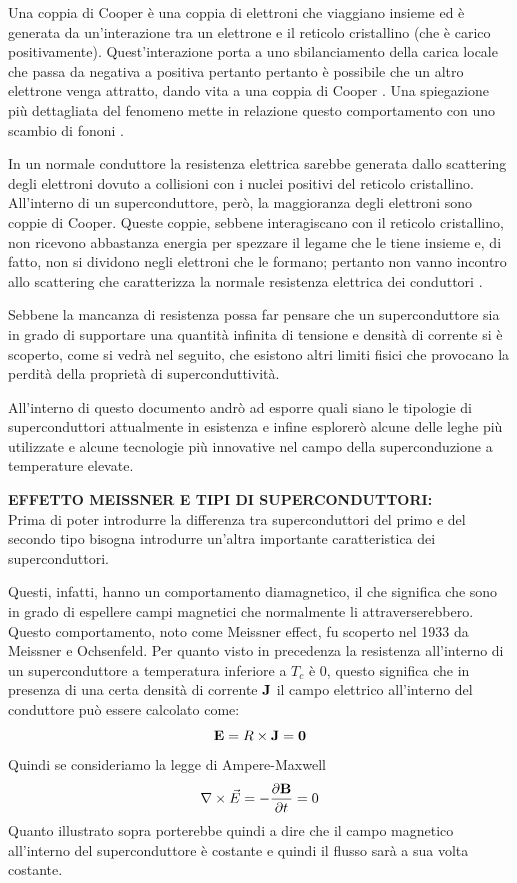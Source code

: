 \documentclass[a4paper,10pt]{article}
\begin{document}
Una coppia di Cooper è una coppia di elettroni che viaggiano insieme ed è generata da
un'interazione tra un elettrone e il reticolo cristallino (che è carico positivamente).
Quest'interazione porta a uno sbilanciamento della carica locale che passa da negativa a positiva
pertanto pertanto è possibile che un altro elettrone venga attratto, dando vita a una coppia di
Cooper \cite{cooper-cambridge}. Una spiegazione più dettagliata del fenomeno mette in relazione
questo comportamento con uno scambio di fononi \cite{quantum-springer}.

In un normale conduttore la resistenza elettrica sarebbe generata dallo scattering degli elettroni
dovuto a collisioni con i nuclei positivi del reticolo cristallino. All'interno di un
superconduttore, però, la maggioranza degli elettroni sono coppie di Cooper. Queste coppie, sebbene
interagiscano con il reticolo cristallino, non ricevono abbastanza energia per spezzare il legame
che le tiene insieme e, di fatto, non si dividono negli elettroni che le formano; pertanto non
vanno incontro allo scattering che caratterizza la normale resistenza elettrica dei conduttori
\cite{bcs-cambridge}.

Sebbene la mancanza di resistenza possa far pensare che un superconduttore sia in grado di
supportare una quantità infinita di tensione e densità di corrente si è scoperto, come si vedrà nel
seguito, che esistono altri limiti fisici che provocano la perdità della proprietà di
superconduttività.

All'interno di questo documento andrò ad esporre quali siano le tipologie di superconduttori
attualmente in esistenza e infine esplorerò alcune delle leghe più utilizzate e alcune tecnologie
più innovative nel campo della superconduzione a temperature elevate.

\bigskip
{}
\label{sec:type-one}
\noindent
\textbf{EFFETTO MEISSNER E TIPI DI SUPERCONDUTTORI:}
\\
Prima di poter introdurre la differenza tra superconduttori del primo e del secondo tipo bisogna
introdurre un'altra importante caratteristica dei superconduttori.

Questi, infatti, hanno un comportamento diamagnetico, il che significa che sono in grado di
espellere campi magnetici che normalmente li attraverserebbero. Questo comportamento, noto come
Meissner effect, fu scoperto nel 1933 da Meissner e Ochsenfeld\cite{meissner}. Per quanto visto in
precedenza la resistenza all'interno di un superconduttore a temperatura inferiore a $T_c$ è $0$,
questo significa che in presenza di una certa densità di corrente $\mathbf{J}$ il campo elettrico
all'interno del conduttore può essere calcolato come:
\begin{equation}
	\mathbf{E} = R \times \mathbf{J} = \mathbf{0}
\end{equation}
Quindi se consideriamo la legge di Ampere-Maxwell
\begin{equation*}
	\nabla \times \vec{E} = - \frac{\partial{\mathbf{B}}}{\partial{t}} = 0
\end{equation*}
Quanto illustrato sopra porterebbe quindi a dire che il campo magnetico all'interno del
superconduttore è costante e quindi il flusso sarà a sua volta costante.
\end{document}
